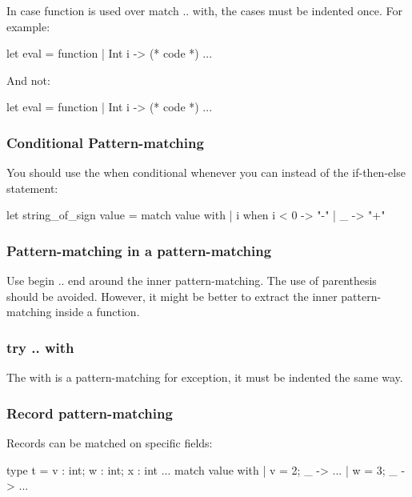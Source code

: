 \documentclass[12pt,a4paper]{article}
\begin{document}
\noindent
In case \textsf{function} is used over \textsf{match .. with}, the cases must be
indented once. For example:

\begin{OCaml}
let eval = function
  | Int i -> (* code *)
...
\end{OCaml}

\noindent
And not:

\begin{OCaml}
let eval = function
           | Int i -> (* code *)
...
\end{OCaml}

\subsubsection*{Conditional Pattern-matching}

You should use the when conditional whenever you can instead of the if-then-else statement:

\begin{OCaml}
let string_of_sign value =
  match value with
  | i when i < 0 -> "-"
  | _ -> "+"
\end{OCaml}

\subsubsection*{Pattern-matching in a pattern-matching}

\medskip

Use \textsf{begin .. end} around the inner pattern-matching. The use of parenthesis should be avoided. However, it might be better to extract the inner pattern-matching inside a function.

\subsubsection*{\textsf{try .. with}}

The with is a pattern-matching for exception, it must be indented the same way.

\subsubsection*{Record pattern-matching}

Records can be matched on specific fields:
\begin{OCaml}
type t = { v : int; w : int; x : int }
...
match value with
| { v = 2; _ } -> ... 
| { w = 3; _ } -> ...
\end{OCaml}
\end{document}
